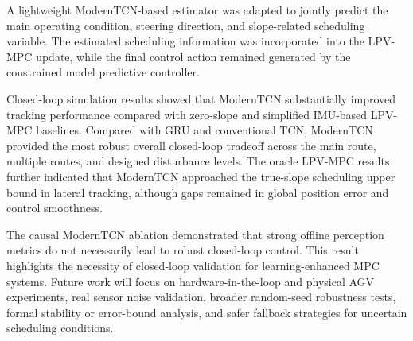 \documentclass{ieeeaccess}
\begin{document}
A lightweight ModernTCN-based estimator was adapted to jointly predict the main operating condition, steering direction, and slope-related scheduling variable. The estimated scheduling information was incorporated into the LPV-MPC update, while the final control action remained generated by the constrained model predictive controller.



Closed-loop simulation results showed that ModernTCN substantially improved tracking performance compared with zero-slope and simplified IMU-based LPV-MPC baselines. Compared with GRU and conventional TCN, ModernTCN provided the most robust overall closed-loop tradeoff across the main route, multiple routes, and designed disturbance levels. The oracle LPV-MPC results further indicated that ModernTCN approached the true-slope scheduling upper bound in lateral tracking, although gaps remained in global position error and control smoothness.



The causal ModernTCN ablation demonstrated that strong offline perception metrics do not necessarily lead to robust closed-loop control. This result highlights the necessity of closed-loop validation for learning-enhanced MPC systems. Future work will focus on hardware-in-the-loop and physical AGV experiments, real sensor noise validation, broader random-seed robustness tests, formal stability or error-bound analysis, and safer fallback strategies for uncertain scheduling conditions.


% 
% 

\EOD
\end{document}
